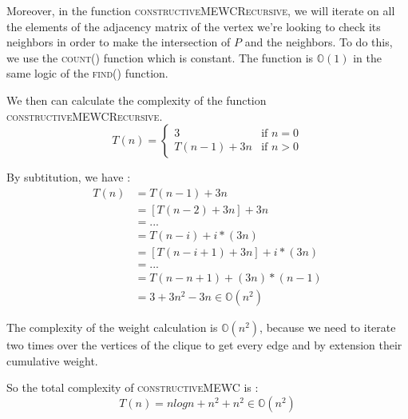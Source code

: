 Moreover, in the function \textsc{constructiveMEWCRecursive}, we will iterate on all the elements of the adjacency matrix of the vertex we're looking to check its neighbors in order to make the intersection of $P$ and the neighbors. To do this, we use the \textsc{count()} function which is constant\footnotemark. The function is $\mathbb{O}(1)$ in the same logic of the \textsc{find()} function.
\bigskip

We then can calculate the complexity of the function \textsc{constructiveMEWCRecursive}. 
\begin{equation}
    T(n)=\begin{cases}
        3        & \text{if } n=0 \\
        T(n-1) + 3n & \text{if } n>0
    \end{cases}
\end{equation}

By subtitution, we have :
\begin{align}
    T(n)&=T(n-1)+3n\\
    &=[T(n-2)+3n]+3n\\
    &=...\\
    &=T(n - i) + i*(3n) \\
    &=[T(n - i  + 1) + 3n] + i*(3n) \\
    &=...\\
    &=T(n - n + 1)+(3n)*(n-1) \\
    &= 3 + 3n^2 - 3n \in \mathbb{O}(n^2)
\end{align}

The complexity of the weight calculation is $\mathbb{O}(n^2)$, because we need to iterate two times over the vertices of the clique to get every edge and by extension their cumulative weight.
\bigskip

So the total complexity of \textsc{constructiveMEWC} is : 
$$ T(n) = n logn + n^2 + n^2 \in \mathbb{O}(n^2) $$